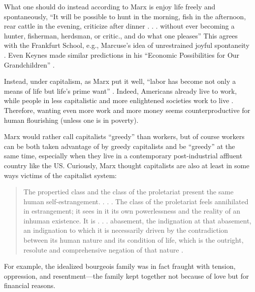 \documentclass[10pt, letterpaper]{article}
\begin{document}
\begin{spacing}{1.8}
What one should do instead according to Marx is enjoy life freely and spontaneously, ``It will be possible to hunt in the morning, fish in the afternoon, rear cattle in the evening, criticize after dinner . . . without ever becoming a hunter, fisherman, herdsman, or critic., and do what one pleases''
%
This agrees with the Frankfurt School, e.g., Marcuse's idea of unrestrained joyful spontaneity \citep{marcuse15}. Even Keynes made similar predictions in his ``Economic Possibilities for Our Grandchildren'' \citep{keynes30}.

Instead, under capitalism, as Marx put it  well, ``labor has become not only a
means of life but life's prime want'' \citep[cited in][p. 91]{struhl16}. Indeed,
Americans already live to work, while people in less capitalistic and more
enlightened societies work to live \citep{aokditella,valente16}. 
Therefore, wanting even more work and more money seems counterproductive for human flourishing (unless one is in poverty). 

Marx would rather call capitalists ``greedy'' than workers, but of course
workers can be both taken advantage of by greedy capitalists and be ``greedy'' at the same time, especially when they live in a contemporary post-industrial affluent country like the US.
Curiously, Marx thought capitalists are also at least in some ways victims of the capitalist system:
\begin{quote}
  The propertied class and the class of the proletariat present the same human
  self-estrangement. . . . The class of the proletariat feels annihilated in
  estrangement; it sees in it its own powerlessness and the reality of an
  inhuman existence. It is . . . abasement, the indignation at that abasement,
  an indignation to which it is necessarily driven by the contradiction between
  its human nature and its condition of life, which is the outright, resolute
  and comprehensive negation of that nature \citep[cited in][p 381]{byron16}.
\end{quote} 

For example, the idealized bourgeois family was in fact fraught with tension,
oppression, and resentment---the family kept together not because of love but for financial reasons.


\end{spacing}
\end{document}
